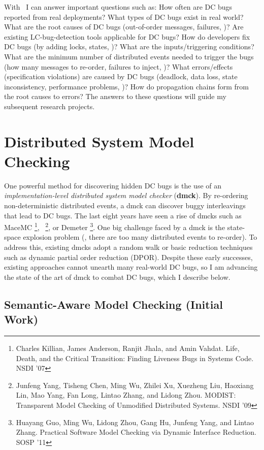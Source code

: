 \documentclass[11pt]{article}
\begin{document}
With \taxdc\, I can answer important questions such as: How often are DC bugs 
reported from real deployments? What types of DC bugs exist in real world?
What are the root causes of DC bugs (out-of-order messages, failures, \etc)?
Are existing LC-bug-detection tools applicable for DC bugs? How do developers
fix DC bugs (by adding locks, states, \etc)? What are the inputs/triggering
conditions?  What are the minimum number of distributed events needed to
trigger the bugs (how many messages to re-order, failures to inject, \etc)?
What errors/effects (specification violations) are caused by DC bugs (deadlock,
data loss, state inconsistency, performance problems, \etc)? How do propagation
chains form from the root causes to errors? The answers to these questions will
guide my subsequent research projects.

\section{Distributed System Model Checking}

One powerful method for discovering hidden DC bugs is the use of an
\textit{implementation-level distributed system model checker} (\textbf{dmck}).
By re-ordering non-deterministic distributed events, a dmck can discover buggy
interleavings that lead to DC bugs. The last eight years have seen a rise of
dmcks such as MaceMC \footnote{Charles Killian, James Anderson, Ranjit Jhala,
and Amin Vahdat. Life, Death, and the Critical Transition: Finding Liveness Bugs
in Systems Code. NSDI '07}, \modist\ \footnote{Junfeng Yang, Tisheng Chen, Ming
Wu, Zhilei Xu, Xuezheng Liu, Haoxiang Lin, Mao Yang, Fan Long, Lintao Zhang, and
Lidong Zhou. MODIST: Transparent Model Checking of Unmodified Distributed
Systems. NSDI '09}, or Demeter \footnote{Huayang Guo, Ming Wu, Lidong Zhou, Gang
Hu, Junfeng Yang, and Lintao Zhang. Practical Software Model Checking via
Dynamic Interface Reduction. SOSP '11}. One big challenge faced by a dmck is the
state-space explosion problem (\ie, there are too many distributed events to
re-order). To address this, existing dmcks adopt a random walk or basic
reduction techniques such as dynamic partial order reduction (DPOR). Despite
these early successes, existing approaches cannot unearth many real-world DC
bugs, so I am advancing the state of the art of dmck to combat DC bugs, which I
describe below.

\subsection{Semantic-Aware Model Checking (Initial Work)} 
\end{document}
